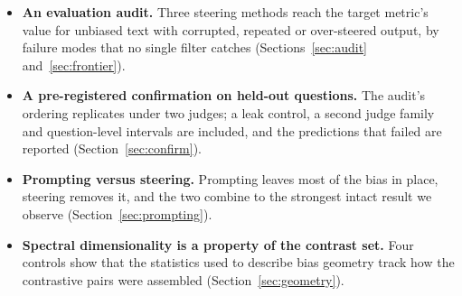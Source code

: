 \begin{itemize}
\item \textbf{An evaluation audit.} Three steering methods reach the target metric's value
  for unbiased text with corrupted, repeated or over-steered output, by failure modes
  that no single filter catches (Sections~\ref{sec:audit} and~\ref{sec:frontier}).
\item \textbf{A pre-registered confirmation on held-out questions.} The audit's ordering
  replicates under two judges; a leak control, a second judge family and question-level
  intervals are included, and the predictions that failed are reported
  (Section~\ref{sec:confirm}).
\item \textbf{Prompting versus steering.} Prompting leaves most of the bias in place,
  steering removes it, and the two combine to the strongest intact result we observe
  (Section~\ref{sec:prompting}).
\item \textbf{Spectral dimensionality is a property of the contrast set.} Four controls
  show that the statistics used to describe bias geometry track how the contrastive
  pairs were assembled (Section~\ref{sec:geometry}).
\end{itemize}
